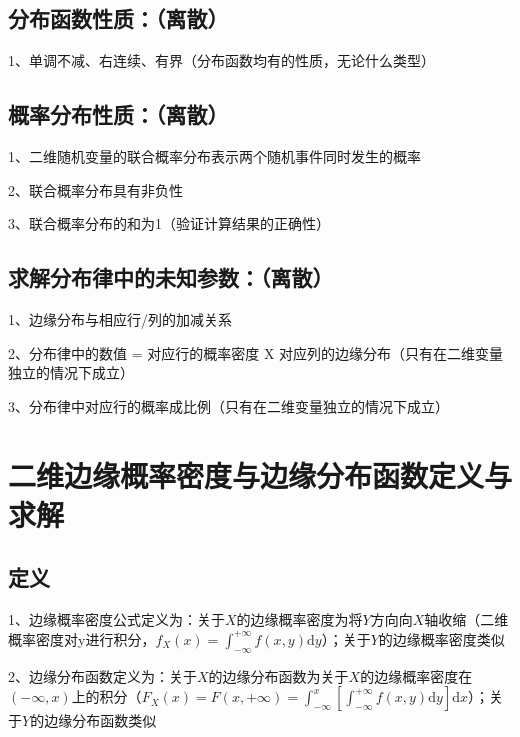 \subsection{分布函数性质：（离散）}

1、单调不减、右连续、有界（分布函数均有的性质，无论什么类型）



\subsection{概率分布性质：（离散）}

1、二维随机变量的联合概率分布表示两个随机事件同时发生的概率

2、联合概率分布具有非负性

3、联合概率分布的和为1（验证计算结果的正确性）



\subsection{求解分布律中的未知参数：（离散）}

1、边缘分布与相应行/列的加减关系

2、分布律中的数值 = 对应行的概率密度 X 对应列的边缘分布（只有在二维变量独立的情况下成立）

3、分布律中对应行的概率成比例（只有在二维变量独立的情况下成立）

\section{二维边缘概率密度与边缘分布函数定义与求解}



\subsection{定义}

1、边缘概率密度公式定义为：关于$X$的边缘概率密度为将$Y$方向向$X$轴收缩（二维概率密度对y进行积分，$f_{X}(x)=\int_{-\infty}^{+\infty} f(x, y) \mathrm{d} y$）；关于$Y$的边缘概率密度类似

2、边缘分布函数定义为：关于$X$的边缘分布函数为关于$X$的边缘概率密度在$(-\infty,x)$上的积分（$F_{X}(x)=F(x,+\infty)=\int_{-\infty}^{x}\left[\int_{-\infty}^{+\infty} f(x, y) \mathrm{d} y\right] \mathrm{d} x$）；关于$Y$的边缘分布函数类似



